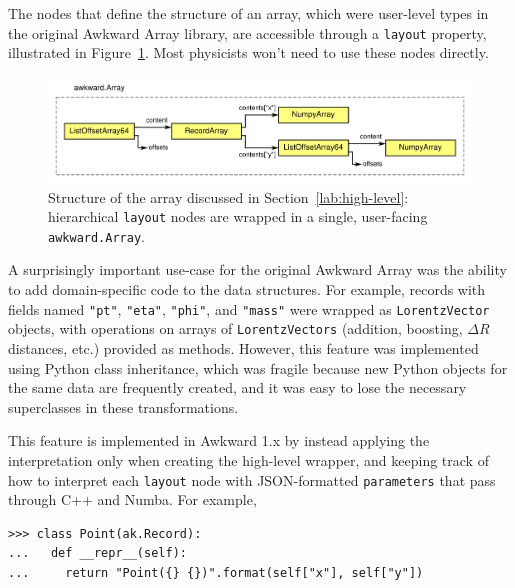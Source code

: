 \documentclass{webofc}
\begin{document}
The nodes that define the structure of an array, which were user-level types in the original Awkward Array library, are accessible through a \texttt{layout} property, illustrated in Figure~\ref{fig:example-hierarchy}. Most physicists won't need to use these nodes directly.

\begin{figure}
\begin{center}
\includegraphics[width=\linewidth]{example-hierarchy.pdf}
\end{center}

\vspace{-0.25 cm}
\caption{Structure of the array discussed in Section~\ref{lab:high-level}: hierarchical \texttt{layout} nodes are wrapped in a single, user-facing \texttt{awkward.Array}. \label{fig:example-hierarchy}}
\end{figure}

A surprisingly important use-case for the original Awkward Array was the ability to add domain-specific code to the data structures. For example, records with fields named \texttt{"pt"}, \texttt{"eta"}, \texttt{"phi"}, and \texttt{"mass"} were wrapped as \texttt{LorentzVector} objects, with operations on arrays of \texttt{LorentzVectors} (addition, boosting, $\Delta R$ distances, etc.) provided as methods. However, this feature was implemented using Python class inheritance, which was fragile because new Python objects for the same data are frequently created, and it was easy to lose the necessary superclasses in these transformations.

This feature is implemented in Awkward 1.x by instead applying the interpretation only when creating the high-level wrapper, and keeping track of how to interpret each \texttt{layout} node with JSON-formatted \texttt{parameters} that pass through C++ and Numba. For example,

\begin{verbatim}
>>> class Point(ak.Record):
...   def __repr__(self):
...     return "Point({} {})".format(self["x"], self["y"])
\end{verbatim}
\end{document}
